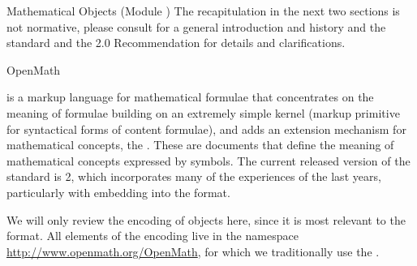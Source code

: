 \begin{tchapter}[id=mobj,short=Mathematical Objects]{Mathematical Objects (Module {})}
The recapitulation in the next two sections is not normative, please consult
{} for a general introduction and history and the {\openmath}
standard and the {\mathml} 2.0 Recommendation for details and clarifications.


\begin{tsection}[id=openmath]{OpenMath}
  
  {\openmath} is a markup language for mathematical formulae that concentrates on the
  meaning of formulae building on an extremely simple kernel (markup primitive for
  syntactical forms of content formulae), and adds an extension mechanism for mathematical
  concepts, the {}.  These are
  {} documents that define the meaning of mathematical concepts
  expressed by {\openmath} symbols.  The current released version of the {\openmath}
  standard is {\openmath}2, which incorporates many of the experiences of the last years,
  particularly with embedding {\openmath} into the {\omdoc} format.

  We will only review the {\xml} encoding of {\openmath} objects here, since it is most
  relevant to the {\omdoc} format. All elements of the {\xml} encoding live in the
  {namespace} \url{http://www.openmath.org/OpenMath}, for
  which we traditionally use the {}
  {}.


\end{tsection}
\end{tchapter}
